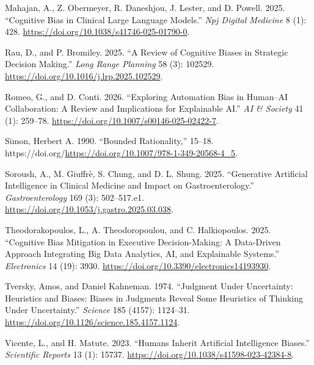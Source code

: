 \documentclass[
  manuscript,
  anonymous,
  review]{acmart}
\newlength{\cslhangindent}
\newenvironment{CSLReferences}[2] %
 {\begin{list}{}{%
  \setlength{\itemindent}{0pt}
  \setlength{\leftmargin}{0pt}
  \setlength{\parsep}{0pt}
  \ifodd #1
   \setlength{\leftmargin}{\cslhangindent}
   \setlength{\itemindent}{-1\cslhangindent}
  \fi
  \setlength{\itemsep}{#2\baselineskip}}}
 {\end{list}}
\begin{document}
\begin{CSLReferences}{1}{0}
Mahajan, A., Z. Obermeyer, R. Daneshjou, J. Lester, and D. Powell. 2025.
{``Cognitive Bias in Clinical Large Language Models.''} \emph{Npj
Digital Medicine} 8 (1): 428.
\url{https://doi.org/10.1038/s41746-025-01790-0}.

Rau, D., and P. Bromiley. 2025. {``A Review of Cognitive Biases in
Strategic Decision Making.''} \emph{Long Range Planning} 58 (3): 102529.
\url{https://doi.org/10.1016/j.lrp.2025.102529}.

Romeo, G., and D. Conti. 2026. {``Exploring Automation Bias in
Human--{AI} Collaboration: {A} Review and Implications for Explainable
{AI}.''} \emph{AI \& Society} 41 (1): 259--78.
\url{https://doi.org/10.1007/s00146-025-02422-7}.

Simon, Herbert A. 1990. {``Bounded Rationality,''} 15--18.
https://doi.org/\url{https://doi.org/10.1007/978-1-349-20568-4_5}.

Soroush, A., M. Giuffrè, S. Chung, and D. L. Shung. 2025. {``Generative
Artificial Intelligence in Clinical Medicine and Impact on
Gastroenterology.''} \emph{Gastroenterology} 169 (3): 502--517.e1.
\url{https://doi.org/10.1053/j.gastro.2025.03.038}.

Theodorakopoulos, L., A. Theodoropoulou, and C. Halkiopoulos. 2025.
{``Cognitive Bias Mitigation in Executive Decision-Making: {A}
Data-Driven Approach Integrating Big Data Analytics, {AI}, and
Explainable Systems.''} \emph{Electronics} 14 (19): 3930.
\url{https://doi.org/10.3390/electronics14193930}.

Tversky, Amos, and Daniel Kahneman. 1974. {``Judgment Under Uncertainty:
Heuristics and Biases: Biases in Judgments Reveal Some Heuristics of
Thinking Under Uncertainty.''} \emph{Science} 185 (4157): 1124--31.
\url{https://doi.org/10.1126/science.185.4157.1124}.

Vicente, L., and H. Matute. 2023. {``Humans Inherit Artificial
Intelligence Biases.''} \emph{Scientific Reports} 13 (1): 15737.
\url{https://doi.org/10.1038/s41598-023-42384-8}.

\end{CSLReferences}
\end{document}
